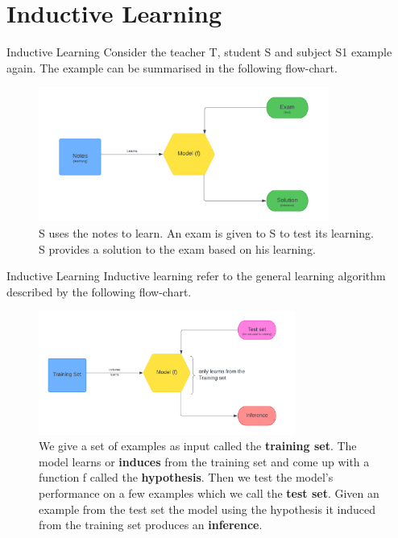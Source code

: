 \documentclass[11pt,notheorems,hyperref={pdfauthor=whatever}]{beamer}
\begin{document}
\section{Inductive Learning}
\begin{frame}{Inductive Learning}
Consider the teacher T, student S and subject S1 example again. The example can be summarised in the following flow-chart. 
\begin{figure}
    \centering
    \includegraphics[width=0.85\textwidth]{figures/Model1_1.png}
    \caption{S uses the notes to learn. An exam is given to S to test its learning. S provides a solution to the exam based on his learning.}
    \label{fig:induce_example}
\end{figure}
\end{frame}

\begin{frame}{Inductive Learning}
Inductive learning refer to the general learning algorithm described by the following flow-chart. 
\begin{figure}
    \centering
    \includegraphics[width=0.75\textwidth]{figures/Model1_2.png}
    \caption{We give a set of examples as input called the \alert{\textbf{training set}}. The model learns or \alert{\textbf{induces}} from the training set and come up with a function f called the \alert{\textbf{hypothesis}}. Then we test the model's performance on a few examples which we call the \alert{\textbf{test set}}. Given an example from the test set the model using the hypothesis it induced from the training set produces an \alert{\textbf{inference}}.}
    \label{fig:gen_induction}
\end{figure}
\end{frame}
\end{document}
